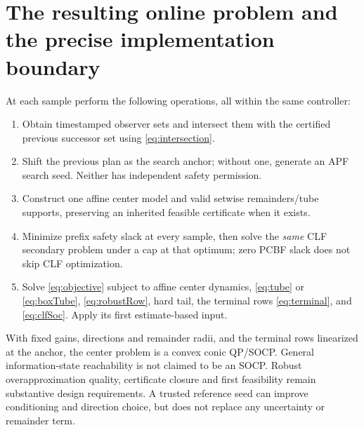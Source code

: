 \documentclass[10pt,letterpaper]{article}
\begin{document}
\section{The resulting online problem and the precise implementation boundary}
At each sample perform the following operations, all within the same controller:
\begin{enumerate}[leftmargin=*,itemsep=3pt]
\item Obtain timestamped observer sets and intersect them with the certified
previous successor set using \eqref{eq:intersection}.
\item Shift the previous plan as the search anchor; without one, generate an
APF search seed. Neither has independent safety permission.
\item Construct one affine center model and valid setwise remainders/tube
supports, preserving an inherited feasible certificate when it exists.
\item Minimize prefix safety slack at every sample, then solve the \emph{same}
CLF secondary problem under a cap at that optimum; zero PCBF slack does not
skip CLF optimization.
\item Solve \eqref{eq:objective} subject to affine center dynamics,
\eqref{eq:tube} or \eqref{eq:boxTube}, \eqref{eq:robustRow}, hard tail, the
terminal rows \eqref{eq:terminal}, and \eqref{eq:clfSoc}. Apply its first
estimate-based input.
\end{enumerate}
With fixed gains, directions and remainder radii, and the terminal rows
linearized at the anchor, the center problem is a convex conic QP/SOCP.
General information-state reachability is not claimed to be an SOCP. Robust overapproximation quality, certificate closure and
first feasibility remain substantive design requirements. A trusted reference
seed can improve conditioning and direction choice, but does not replace any
uncertainty or remainder term.

\begin{center}
\end{center}
\end{document}
